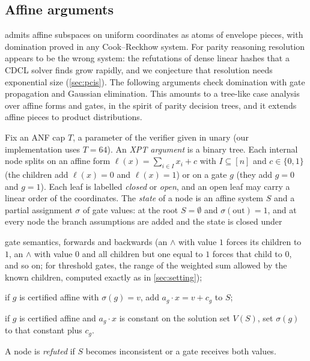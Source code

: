 \subsection{Affine arguments}\label{sec:xpt}

 admits affine subspaces on uniform coordinates as atoms of envelope
pieces, with domination proved in any Cook--Reckhow system. For parity reasoning
resolution appears to be the wrong system: the refutations of dense linear hashes that
a CDCL solver finds grow rapidly, and we conjecture that resolution needs exponential
size (\cref{sec:pcis}). The
following arguments check domination with gate propagation and Gaussian elimination.
This amounts to a tree-like case analysis over affine forms and gates, in the spirit
of parity decision trees, and it extends affine pieces to product distributions.

\begin{definition}\label{def:xpt}
Fix an ANF cap $T$, a parameter of the verifier given in unary (our implementation
uses $T=64$). An \emph{XPT argument} is a binary tree. Each internal node splits on an
affine form $\ell(x)=\sum_{i\in I}x_i+c$ with $I\subseteq[n]$ and $c\in\{0,1\}$ (the
children add $\ell(x)=0$ and $\ell(x)=1$) or on a gate $g$ (they add $g=0$ and $g=1$). Each leaf is labelled \emph{closed} or
\emph{open}, and an open leaf may carry a linear order of the coordinates. The
\emph{state} of a node is an affine system $S$ and a partial assignment $\sigma$ of gate
values: at the root $S=\emptyset$ and $\sigma(\mathrm{out})=1$, and at every node the
branch assumptions are added and the state is closed under
\begin{description}[style=sameline,leftmargin=1.5em]
\item[(X1)] gate semantics, forwards and backwards (an $\wedge$ with value $1$ forces its
children to $1$, an $\wedge$ with value $0$ and all children but one equal to $1$ forces
that child to $0$, and so on; for threshold gates, the range of the weighted sum allowed
by the known children, computed exactly as in \cref{sec:setting});
\item[(X2)] if $g$ is certified affine with $\sigma(g)=v$, add $a_g\cdot x=v+c_g$ to $S$;
\item[(X3)] if $g$ is certified affine and $a_g\cdot x$ is constant on the solution set
$V(S)$, set $\sigma(g)$ to that constant plus $c_g$.
\end{description}
A node is \emph{refuted} if $S$ becomes inconsistent or a gate receives both values.
\end{definition}

